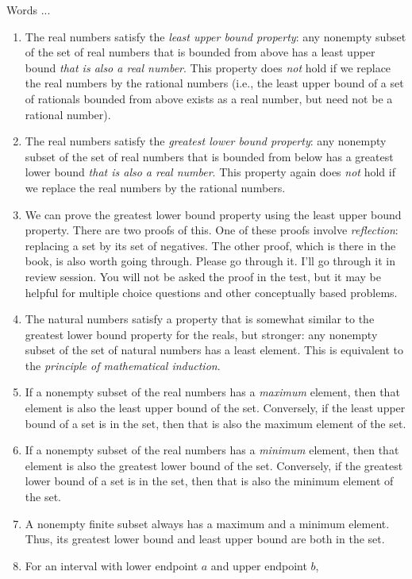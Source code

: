 \documentclass[10pt]{amsart}
\begin{document}
Words ...

\begin{enumerate}
\item The real numbers satisfy the {\em least upper bound property}:
  any nonempty subset of the set of real numbers that is bounded from
  above has a least upper bound {\em that is also a real number}. This
  property does {\em not} hold if we replace the real numbers by the
  rational numbers (i.e., the least upper bound of a set of rationals
  bounded from above exists as a real number, but need not be a
  rational number).
\item The real numbers satisfy the {\em greatest lower bound
  property}: any nonempty subset of the set of real numbers that is
  bounded from below has a greatest lower bound {\em that is also a
  real number}. This property again does {\em not} hold if we replace
  the real numbers by the rational numbers.
\item We can prove the greatest lower bound property using the least
  upper bound property. There are two proofs of this. One of these
  proofs involve {\em reflection}: replacing a set by its set of
  negatives. The other proof, which is there in the book, is also
  worth going through. Please go through it. I'll go through it in
  review session. You will not be asked the proof in the test, but it
  may be helpful for multiple choice questions and other conceptually
  based problems.
\item The natural numbers satisfy a property that is somewhat similar
  to the greatest lower bound property for the reals, but stronger:
  any nonempty subset of the set of natural numbers has a least
  element. This is equivalent to the {\em principle of mathematical
  induction}.
\item If a nonempty subset of the real numbers has a {\em maximum}
  element, then that element is also the least upper bound of the
  set. Conversely, if the least upper bound of a set is in the set,
  then that is also the maximum element of the set.
\item If a nonempty subset of the real numbers has a {\em minimum}
  element, then that element is also the greatest lower bound of the
  set. Conversely, if the greatest lower bound of a set is in the set,
  then that is also the minimum element of the set.
\item A nonempty finite subset always has a maximum and a minimum
  element. Thus, its greatest lower bound and least upper bound are
  both in the set.
\item For an interval with lower endpoint $a$ and upper endpoint $b$,

\end{enumerate}
\end{document}
